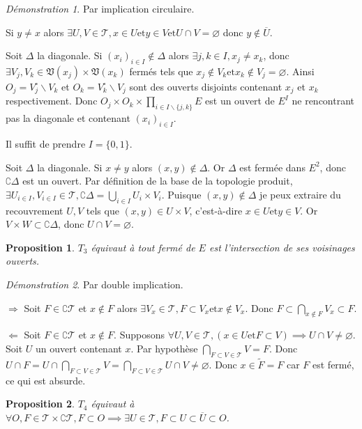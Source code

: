 \documentclass[a4paper, 11pt, french]{book}
\newenvironment{itemise}{\itemize}{\enditemize}
\theoremstyle{plain} %
\newtheorem{proposition}{Proposition}
\theoremstyle{definition} %
\theoremstyle{remark} %
\newtheorem*{demonstration}{Démonstration}
\renewcommand{\setminus}{\backslash}
\newcommand{\1}{\mathds{1}}
\newcommand\vide{\varnothing}
\newcommand{\et}{\mathrel{\mathrm{et}}}
\renewcommand{\frak}[1]{\mathfrak{#1}}
\newcommand{\scr}[1]{\mathscr{#1}}
\newcommand\equivalence[3]{
	\begin{demonstration}
		#1
		\begin{itemise}
			\item[$\Longrightarrow$] #2
			\item[$\Longleftarrow$] #3
		\end{itemise}
	\end{demonstration}
}
\begin{document}
\begin{demonstration}
	Par implication circulaire.
	\begin{itemise}
		\item Si $y\neq x$ alors $\exists U, V\in\scr{T}, x\in U\et y\in V\et U\cap V=\vide$ donc $y\notin\overline{U}$.
		\item Soit $\Delta$ la diagonale.
		Si $(x_i)_{i\in I}\notin\Delta$ alors $\exists j, k\in I, x_j\neq x_k$, donc $\exists V_j, V_k\in\frak{V}(x_j)\times\frak{V}(x_k)$ fermés tels que $x_j\notin V_k\et x_k\notin V_j=\vide$.
		Ainsi $O_j=V_j^\circ\setminus V_k$ et $O_k=V_k^\circ\setminus V_j$ sont des ouverts disjoints contenant $x_j$ et $x_k$ respectivement.
		Donc $O_j\times O_k\times\prod_{i\in I\setminus\{j, k\}}E$ est un ouvert de $E^I$ ne rencontrant pas la diagonale et contenant $(x_i)_{i\in I}$.
		\item Il suffit de prendre $I=\{0, 1\}$.
		\item Soit $\Delta$ la diagonale.
		Si $x\neq y$ alors $(x, y)\notin\Delta$.
		Or $\Delta$ est fermée dans $E^2$, donc $\complement\Delta$ est un ouvert.
		Par définition de la base de la topologie produit, $\exists U_{i\in I}, V_{i\in I}\in\scr{T}, \complement\Delta=\bigcup_{i\in I} U_i\times V_i$.
		Puisque $(x, y)\notin\Delta$ je peux extraire du recouvrement $U, V$ tels que $(x, y)\in U\times V$, c'est-à-dire $x\in U\et y\in V$.
		Or $V\times W\subset\complement\Delta$, donc $U\cap V=\vide$.
	\end{itemise}
\end{demonstration}

\begin{proposition}
	$T_3$ équivaut à tout fermé de $E$ est l'intersection de ses voisinages ouverts.
\end{proposition}

\equivalence{Par double implication.}{
	Soit $F\in\complement\scr{T}$ et $x\notin F$ alors $\exists V_x\in\scr{T}, F\subset V_x\et x\notin V_x$.
		Donc $F\subset\bigcap_{x\notin F}V_x\subset F$.
}{
	Soit $F\in\complement\scr{T}$ et $x\notin F$.
		Supposons $\forall U, V\in\scr{T}, (x\in U\et F\subset V)\implies U\cap V\neq\vide$.
		Soit $U$ un ouvert contenant $x$.
		Par hypothèse $\bigcap_{F\subset V\in\scr{T}}V=F$.
		Donc $U\cap F=U\cap\bigcap_{F\subset V\in\scr{T}}V=\bigcap_{F\subset V\in\scr{T}}U\cap V\neq\vide$.
		Donc $x\in\widetilde{F}=F$ car $F$ est fermé, ce qui est absurde.
}

\begin{proposition}
	$T_4$ équivaut à $\forall O, F\in\scr{T}\times\complement\scr{T}, F\subset O\implies\exists U\in\scr{T}, F\subset U\subset\overline{U}\subset O$.
\end{proposition}
\end{document}
